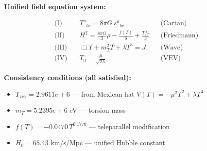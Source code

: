 
\textbf{Unified field equation system:}

\begin{align}
  \text{(I)} \quad & T^a{}_{bc} = 8\pi G \, s^a{}_{bc} && \text{(Cartan)} \\
  \text{(II)} \quad & H^2 = \frac{8\pi G}{3}\rho - \frac{f(T)}{6} + \frac{Tf_T}{3} && \text{(Friedmann)} \\
  \text{(III)} \quad & \Box T + m_T^2 T + \lambda T^3 = J && \text{(Wave)} \\
  \text{(IV)} \quad & T_0 = \frac{\mu}{\sqrt{2\lambda}} && \text{(VEV)}
\end{align}

\textbf{Consistency conditions (all satisfied):}
\begin{itemize}
  \item $T_{\text{vev}} = 2.9611e+6$ — from Mexican hat $V(T) = -\mu^2 T^2 + \lambda T^4$
  \item $m_T = 5.2395e+6$ eV — torsion mass
  \item $f(T) = -0.0470 \, T^{0.1778}$ — teleparallel modification
  \item $H_0 = 65.43$ km/s/Mpc — unified Hubble constant
\end{itemize}